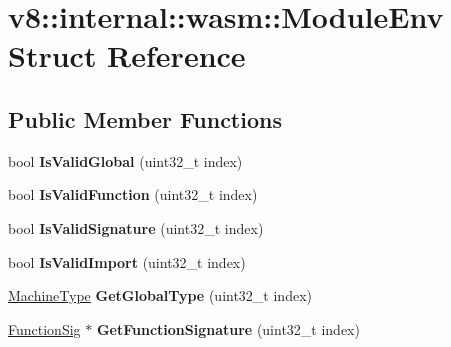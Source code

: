 \hypertarget{structv8_1_1internal_1_1wasm_1_1_module_env}{}\section{v8\+:\+:internal\+:\+:wasm\+:\+:Module\+Env Struct Reference}
\label{structv8_1_1internal_1_1wasm_1_1_module_env}
\subsection*{Public Member Functions}
\begin{DoxyCompactItemize}
\item 
bool {\bfseries Is\+Valid\+Global} (uint32\+\_\+t index)\hypertarget{structv8_1_1internal_1_1wasm_1_1_module_env_aedc30652066aafcc94c85ac1e5fa8882}{}\label{structv8_1_1internal_1_1wasm_1_1_module_env_aedc30652066aafcc94c85ac1e5fa8882}

\item 
bool {\bfseries Is\+Valid\+Function} (uint32\+\_\+t index)\hypertarget{structv8_1_1internal_1_1wasm_1_1_module_env_aee793a8dea1f1c98dedf1c1b12f82efa}{}\label{structv8_1_1internal_1_1wasm_1_1_module_env_aee793a8dea1f1c98dedf1c1b12f82efa}

\item 
bool {\bfseries Is\+Valid\+Signature} (uint32\+\_\+t index)\hypertarget{structv8_1_1internal_1_1wasm_1_1_module_env_ae8d2babb5c105e92ea56b2caf83876ae}{}\label{structv8_1_1internal_1_1wasm_1_1_module_env_ae8d2babb5c105e92ea56b2caf83876ae}

\item 
bool {\bfseries Is\+Valid\+Import} (uint32\+\_\+t index)\hypertarget{structv8_1_1internal_1_1wasm_1_1_module_env_ab31be20c5ddd721c389a0f11f5313456}{}\label{structv8_1_1internal_1_1wasm_1_1_module_env_ab31be20c5ddd721c389a0f11f5313456}

\item 
\hyperlink{classv8_1_1internal_1_1_machine_type}{Machine\+Type} {\bfseries Get\+Global\+Type} (uint32\+\_\+t index)\hypertarget{structv8_1_1internal_1_1wasm_1_1_module_env_af6f1736d9d009035c54fdd9b61d21b31}{}\label{structv8_1_1internal_1_1wasm_1_1_module_env_af6f1736d9d009035c54fdd9b61d21b31}

\item 
\hyperlink{classv8_1_1internal_1_1_signature}{Function\+Sig} $\ast$ {\bfseries Get\+Function\+Signature} (uint32\+\_\+t index)\hypertarget{structv8_1_1internal_1_1wasm_1_1_module_env_afcd1830827d48d470daea7c129d02183}{}\label{structv8_1_1internal_1_1wasm_1_1_module_env_afcd1830827d48d470daea7c129d02183}


\end{DoxyCompactItemize}
